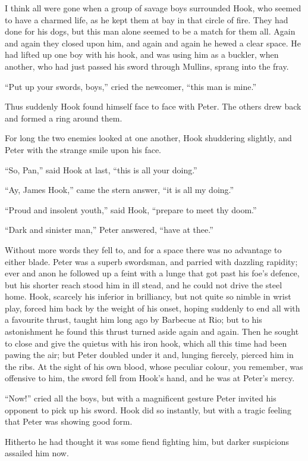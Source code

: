 I think all were gone when a group of savage boys surrounded Hook, who
seemed to have a charmed life, as he kept them at bay in that circle of
fire. They had done for his dogs, but this man alone seemed to be a
match for them all. Again and again they closed upon him, and again and
again he hewed a clear space. He had lifted up one boy with his hook,
and was using him as a buckler, when another, who had just passed his
sword through Mullins, sprang into the fray.

``Put up your swords, boys,'' cried the newcomer, ``this man is mine.''

Thus suddenly Hook found himself face to face with Peter. The others
drew back and formed a ring around them.

For long the two enemies looked at one another, Hook shuddering
slightly, and Peter with the strange smile upon his face.

``So, Pan,'' said Hook at last, ``this is all your doing.''

``Ay, James Hook,'' came the stern answer, ``it is all my doing.''

``Proud and insolent youth,'' said Hook, ``prepare to meet thy doom.''

``Dark and sinister man,'' Peter answered, ``have at thee.''

Without more words they fell to, and for a space there was no advantage
to either blade. Peter was a superb swordsman, and parried with
dazzling rapidity; ever and anon he followed up a feint with a lunge
that got past his foe's defence, but his shorter reach stood him in ill
stead, and he could not drive the steel home. Hook, scarcely his
inferior in brilliancy, but not quite so nimble in wrist play, forced
him back by the weight of his onset, hoping suddenly to end all with a
favourite thrust, taught him long ago by Barbecue at Rio; but to his
astonishment he found this thrust turned aside again and again. Then he
sought to close and give the quietus with his iron hook, which all this
time had been pawing the air; but Peter doubled under it and, lunging
fiercely, pierced him in the ribs. At the sight of his own blood, whose
peculiar colour, you remember, was offensive to him, the sword fell
from Hook's hand, and he was at Peter's mercy.

``Now!'' cried all the boys, but with a magnificent gesture Peter invited
his opponent to pick up his sword. Hook did so instantly, but with a
tragic feeling that Peter was showing good form.

Hitherto he had thought it was some fiend fighting him, but darker
suspicions assailed him now.


